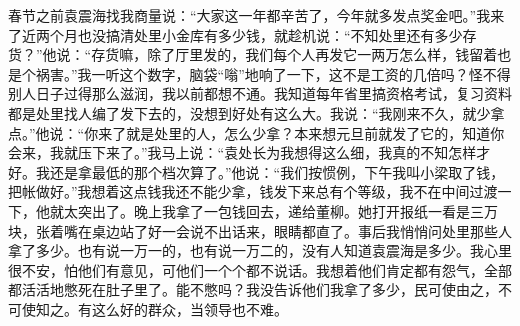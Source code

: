 \documentclass[12pt,oneside]{book}
\begin{document}
春节之前袁震海找我商量说：``大家这一年都辛苦了，今年就多发点奖金吧。''我来了近两个月也没搞清处里小金库有多少钱，就趁机说：``不知处里还有多少存货？''他说：``存货嘛，除了厅里发的，我们每个人再发它一两万怎么样，钱留着也是个祸害。''我一听这个数字，脑袋``嗡''地响了一下，这不是工资的几倍吗？怪不得别人日子过得那么滋润，我以前都想不通。我知道每年省里搞资格考试，复习资料都是处里找人编了发下去的，没想到好处有这么大。我说：``我刚来不久，就少拿点。''他说：``你来了就是处里的人，怎么少拿？本来想元旦前就发了它的，知道你会来，我就压下来了。''我马上说：``袁处长为我想得这么细，我真的不知怎样才好。我还是拿最低的那个档次算了。''他说：``我们按惯例，下午我叫小梁取了钱，把帐做好。''我想着这点钱我还不能少拿，钱发下来总有个等级，我不在中间过渡一下，他就太突出了。晚上我拿了一包钱回去，递给董柳。她打开报纸一看是三万块，张着嘴在桌边站了好一会说不出话来，眼睛都直了。事后我悄悄问处里那些人拿了多少。也有说一万一的，也有说一万二的，没有人知道袁震海是多少。我心里很不安，怕他们有意见，可他们一个个都不说话。我想着他们肯定都有怨气，全部都活活地憋死在肚子里了。能不憋吗？我没告诉他们我拿了多少，民可使由之，不可使知之。有这么好的群众，当领导也不难。
\end{document}

